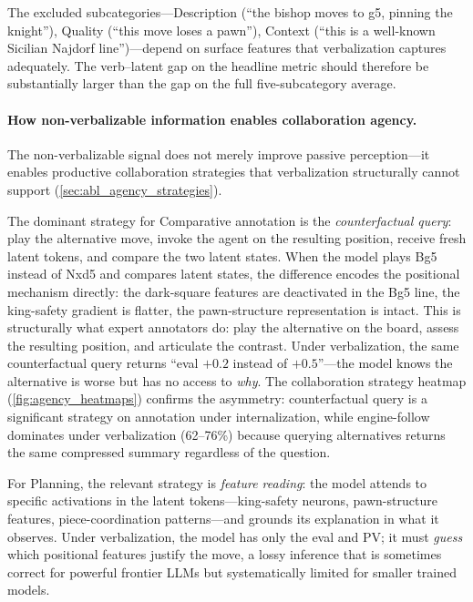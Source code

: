 The excluded subcategories---Description (``the bishop moves to g5,
pinning the knight''), Quality (``this move loses a pawn''), Context
(``this is a well-known Sicilian Najdorf line'')---depend on surface
features that verbalization captures adequately.
The verb--latent gap on the headline metric should therefore be
substantially larger than the gap on the full five-subcategory average.

\paragraph{How non-verbalizable information enables collaboration agency.}
The non-verbalizable signal does not merely improve passive perception---it
enables productive collaboration strategies that verbalization structurally
cannot support (\cref{sec:abl_agency_strategies}).

The dominant strategy for Comparative annotation is the \emph{counterfactual
query}: play the alternative move, invoke the agent on the resulting
position, receive fresh latent tokens, and compare the two latent states.
When the model plays Bg5 instead of Nxd5 and compares latent states, the
difference encodes the positional mechanism directly: the dark-square
features are deactivated in the Bg5 line, the king-safety gradient is
flatter, the pawn-structure representation is intact.
This is structurally what expert annotators do: play the alternative on the
board, assess the resulting position, and articulate the contrast.
Under verbalization, the same counterfactual query returns ``eval $+0.2$
instead of $+0.5$''---the model knows the alternative is worse but has no
access to \emph{why}.
The collaboration strategy heatmap (\cref{fig:agency_heatmaps}) confirms
the asymmetry: counterfactual
query is a significant strategy on annotation under internalization, while
engine-follow dominates under verbalization (62--76\%) because querying
alternatives returns the same compressed summary regardless of the question.

For Planning, the relevant strategy is \emph{feature reading}: the model
attends to specific activations in the latent tokens---king-safety neurons,
pawn-structure features, piece-coordination patterns---and grounds its
explanation in what it observes.
Under verbalization, the model has only the eval and PV; it must
\emph{guess} which positional features justify the move, a lossy inference
that is sometimes correct for powerful frontier LLMs but systematically
limited for smaller trained models.


